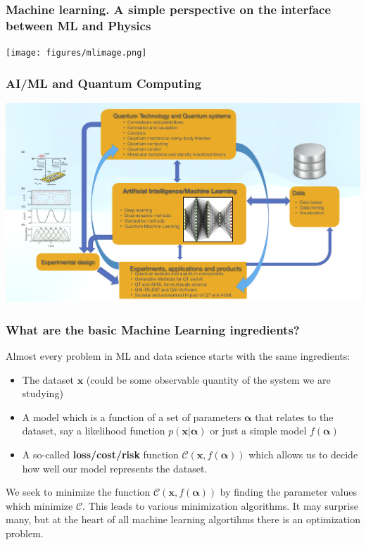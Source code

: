 \documentclass{beamer}
\begin{document}
\begin{frame}
\frametitle{Machine learning. A simple perspective on the interface between ML and Physics}

\vspace{6mm}

\centerline{\texttt{[image: figures/mlimage.png]}}

\vspace{6mm}
\end{frame}

\begin{frame}
\frametitle{AI/ML and Quantum Computing}

\vspace{6mm}

\centerline{\includegraphics[width=1.0\linewidth]{figures/QAIfig1.png}}

\vspace{6mm}
\end{frame}

\begin{frame}
\frametitle{What are the basic Machine Learning ingredients?}

\begin{block}{}
Almost every problem in ML and data science starts with the same ingredients:
\begin{itemize}
\item The dataset $\bm{x}$ (could be some observable quantity of the system we are studying)

\item A model which is a function of a set of parameters $\bm{\alpha}$ that relates to the dataset, say a likelihood  function $p(\bm{x}\vert \bm{\alpha})$ or just a simple model $f(\bm{\alpha})$

\item A so-called \textbf{loss/cost/risk} function $\mathcal{C} (\bm{x}, f(\bm{\alpha}))$ which allows us to decide how well our model represents the dataset. 
\end{itemize}

\noindent
We seek to minimize the function $\mathcal{C} (\bm{x}, f(\bm{\alpha}))$ by finding the parameter values which minimize $\mathcal{C}$. This leads to  various minimization algorithms. It may surprise many, but at the heart of all machine learning algortihms there is an optimization problem. 
\end{block}
\end{frame}
\end{document}
